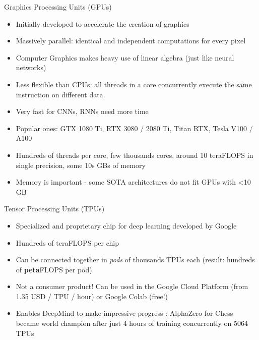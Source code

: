 \begin{frame} {Graphics Processing Units (GPUs)}
  \begin{itemize}
    \item Initially developed to accelerate the creation of graphics
    \item Massively parallel: identical and independent computations for every pixel
    \item Computer Graphics makes heavy use of linear algebra (just like neural networks)
    \item Less flexible than CPUs: all threads in a core concurrently execute the same instruction on different data.
    \item Very fast for CNNs, RNNs need more time
    \item Popular ones: GTX 1080 Ti, RTX 3080 / 2080 Ti, Titan RTX, Tesla V100 / A100
    \item Hundreds of threads per core, few thousands cores, around 10 teraFLOPS in single precision, some 10s GBs of memory
    \item Memory is important - some SOTA architectures do not fit GPUs with <10 GB  
  \end{itemize}
\end{frame}

\begin{frame} {Tensor Processing Units (TPUs)}
  \begin{itemize}
    \item Specialized and proprietary chip for deep learning developed by Google
    \item Hundreds of teraFLOPS per chip
    \item Can be connected together in \emph{pods} of thousands TPUs each (result: hundreds of \textbf{peta}FLOPS per pod)
    \item Not a consumer product! Can be used in the Google Cloud Platform (from 1.35 USD / TPU / hour) or Google Colab (free!)
    \item Enables DeepMind to make impressive progress : AlphaZero for Chess became world champion after just 4 hours of training concurrently on 5064 TPUs
  \end{itemize}
\end{frame}

